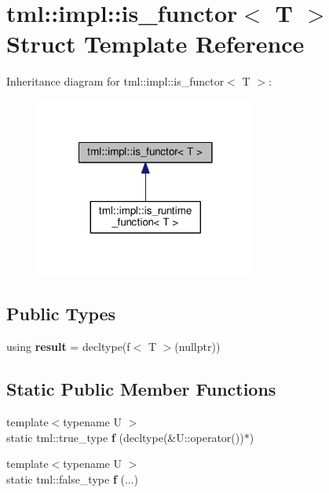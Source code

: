 \hypertarget{structtml_1_1impl_1_1is__functor}{\section{tml\+:\+:impl\+:\+:is\+\_\+functor$<$ T $>$ Struct Template Reference}
\label{structtml_1_1impl_1_1is__functor}
}


Inheritance diagram for tml\+:\+:impl\+:\+:is\+\_\+functor$<$ T $>$\+:
\nopagebreak
\begin{figure}[H]
\begin{center}
\leavevmode
\includegraphics[width=206pt]{structtml_1_1impl_1_1is__functor__inherit__graph}
\end{center}
\end{figure}
\subsection*{Public Types}
\begin{DoxyCompactItemize}
\item 
\hypertarget{structtml_1_1impl_1_1is__functor_a348030d461216e40f41f079712f21aec}{using {\bfseries result} = decltype(f$<$ T $>$(nullptr))}\label{structtml_1_1impl_1_1is__functor_a348030d461216e40f41f079712f21aec}

\end{DoxyCompactItemize}
\subsection*{Static Public Member Functions}
\begin{DoxyCompactItemize}
\item 
\hypertarget{structtml_1_1impl_1_1is__functor_a3a60ed6b4c16e7f0c52f33fae15b1c30}{{\footnotesize template$<$typename U $>$ }\\static tml\+::true\+\_\+type {\bfseries f} (decltype(\&U\+::operator())$\ast$)}\label{structtml_1_1impl_1_1is__functor_a3a60ed6b4c16e7f0c52f33fae15b1c30}

\item 
\hypertarget{structtml_1_1impl_1_1is__functor_a7cf6266da53af192cbcc74dc84063901}{{\footnotesize template$<$typename U $>$ }\\static tml\+::false\+\_\+type {\bfseries f} (...)}\label{structtml_1_1impl_1_1is__functor_a7cf6266da53af192cbcc74dc84063901}

\end{DoxyCompactItemize}


